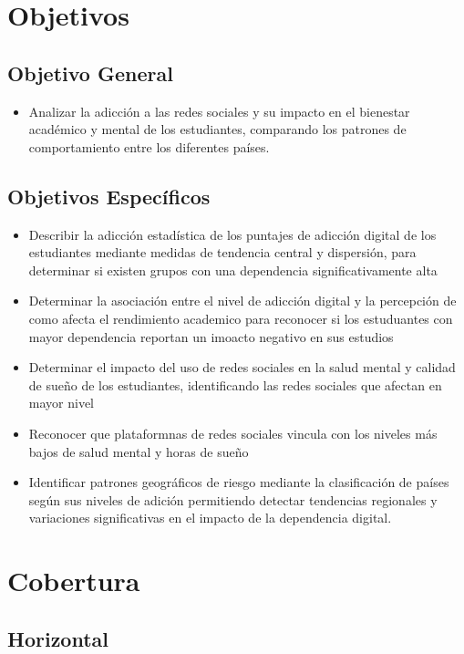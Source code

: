 \documentclass[oneside,11pt]{Latex/Classes/PhDthesisPSnPDF}
\begin{document}
\section{Objetivos}

\subsection{Objetivo General}
\begin{itemize}
  \item{Analizar la adicción a las redes sociales y su impacto en el bienestar académico y mental de los estudiantes, comparando los patrones de comportamiento entre los diferentes países.}
\end{itemize}

\subsection{Objetivos Específicos}
\begin{itemize}
  \item{Describir la adicción estadística de los puntajes de adicción digital de los estudiantes mediante medidas de tendencia central y dispersión, para determinar si existen grupos con una dependencia significativamente alta}
  \item{Determinar la asociación entre el nivel de adicción digital y la percepción de como afecta el rendimiento academico para reconocer si los estuduantes con mayor dependencia reportan un imoacto negativo en sus estudios}
  \item{Determinar el impacto del uso de redes sociales en la salud mental y calidad de sueño de los estudiantes, identificando las redes sociales que afectan en mayor nivel}
  \item{Reconocer que plataformnas de redes sociales vincula con los niveles más bajos de salud mental y horas de sueño}
  \item{Identificar patrones geográficos de riesgo mediante la clasificación de países según sus niveles de adición permitiendo detectar tendencias regionales y variaciones significativas en el impacto de la dependencia digital. }
\end{itemize}

\section{Cobertura}

\subsection{Horizontal}
\end{document}
